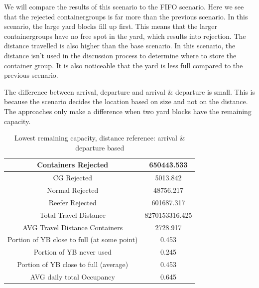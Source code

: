 \documentclass{article}
\begin{document}
We will compare the results of this scenario to the FIFO scenario. Here we see
that the rejected containergroups is far more than the previous scenario. In
this scenario, the large yard blocks fill up first. This means that the larger
containergroups have no free spot in the yard, which results into rejection.
The distance travelled is also higher than the base scenario. In this scenario,
the distance isn't used in the discussion process to determine where to store
the container group. It is also noticeable that the yard is less full compared
to the previous scenario.

The difference between arrival, departure and arrival \& departure is small.
This is because the scenario decides the location based on size and not on the
distance. The approaches only make a difference when two yard blocks have the
remaining capacity.
\begin{table}[h]
    \centering
    \begin{tabular}{|c|c|}
        \hline
        Containers Rejected                         & 650443.533     \\ \hline
        CG Rejected                                 & 5013.842       \\ \hline
        Normal Rejected                             & 48756.217      \\ \hline
        Reefer Rejected                             & 601687.317     \\ \hline
        Total Travel Distance                       & 8270153316.425 \\ \hline
        AVG Travel Distance Containers              & 2728.917       \\ \hline
        Portion of YB close to full (at some point) & 0.453          \\ \hline
        Portion of YB never used                    & 0.245          \\ \hline
        Portion of YB close to full (average)       & 0.453          \\ \hline
        AVG daily total Occupancy                   & 0.645          \\ \hline
    \end{tabular}
    \caption{Lowest remaining capacity,  distance reference: arrival \& departure based}
\end{table}
\end{document}
